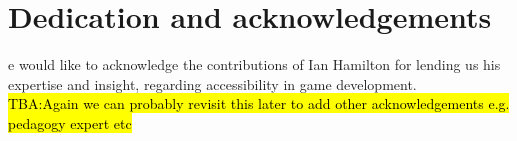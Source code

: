 %
%

\chapter*{Dedication and acknowledgements}
\begin{SingleSpace}
e  would like to acknowledge the contributions of Ian Hamilton for lending us his expertise and insight, regarding accessibility in game development.
\\
\hl{TBA:Again we can probably revisit this later to add other acknowledgements e.g. pedagogy expert etc}
\end{SingleSpace}
\clearpage